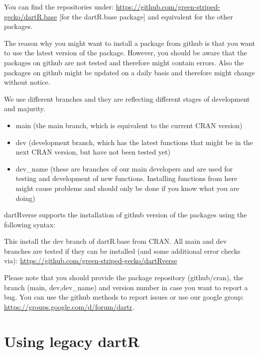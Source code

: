 \documentclass[
  letterpaper,
  DIV=11,
  numbers=noendperiod]{scrreprt}
\providecommand{\tightlist}{%
  \setlength{\itemsep}{0pt}\setlength{\parskip}{0pt}}\usepackage{longtable,booktabs,array}
\let\textttOrig\texttt
\renewcommand{\texttt}[1]{\textttOrig{\color{blue}{#1}}}
\begin{document}
You can find the repositories under:
\url{https://github.com/green-striped-gecko/dartR.base} {[}for the
dartR.base package{]} and equivalent for the other packages.

The reason why you might want to install a package from github is that
you want to use the latest version of the package. However, you should
be aware that the packages on github are not tested and therefore might
contain errors. Also the packages on github might be updated on a daily
basis and therefore might change without notice.

We use different branches and they are reflecting different stages of
development and majurity.

\begin{itemize}
\tightlist
\item
  main (the main branch, which is equivalent to the current CRAN
  version)
\item
  dev (development branch, which has the latest functions that might be
  in the next CRAN version, but have not been tested yet)
\item
  dev\_name (these are branches of our main developers and are used for
  testing and development of new functions. Installing functions from
  here might cause problems and should only be done if you know what you
  are doing)
\end{itemize}

dartRverse supports the installation of github version of the packages
using the following syntax:

\texttt{dartRverse\_install(package\ =\ "dartR.base,\ repo\ =\ "github",\ branch\ =\ "dev")}

This install the dev branch of dartR.base from CRAN. All main and dev
branches are tested if they can be installed (and some additional error
checks via): \url{https://github.com/green-striped-gecko/dartRverse}

Please note that you should provide the package repository
(github/cran), the branch (main, dev,dev\_name) and version number in
case you want to report a bug. You can use the github methods to report
issues or use our google group:
\url{https://groups.google.com/d/forum/dartr}.

\hypertarget{using-legacy-dartr}{%
\section*{Using legacy dartR}\label{using-legacy-dartr}}
\end{document}
